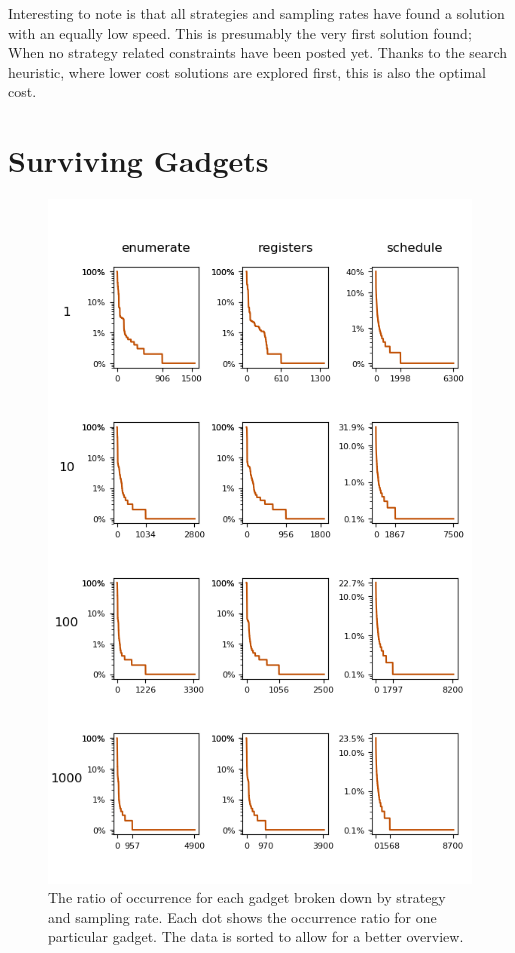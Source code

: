 Interesting to note is that all strategies and sampling rates have found a solution with
an equally low speed. This is presumably the very first solution found; When no strategy
related constraints have been posted yet. Thanks to the search heuristic, where lower cost
solutions are explored first, this is also the optimal cost.

\section{Surviving Gadgets}


\begin{figure}[htp]
	\centering
	\includegraphics[width=\textwidth,height=\textheight]{results/figures/gadgets}
	\caption{The ratio of occurrence for each gadget broken down by strategy and sampling rate.
Each dot shows the occurrence ratio for one particular gadget. The data is sorted to allow
	for a better overview.}
	\label{fig:gadgets}
\end{figure}

